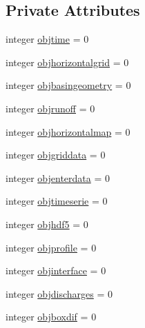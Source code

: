 \subsection*{Private Attributes}
\begin{DoxyCompactItemize}
\item 
integer \mbox{\hyperlink{structmodulerunoffproperties_1_1t__runoffproperties_a5240f215e0abb8b4ef0f3f9be17ce68b}{objtime}} = 0
\item 
integer \mbox{\hyperlink{structmodulerunoffproperties_1_1t__runoffproperties_a23798a5351dce008f85a9fdc5c9fb684}{objhorizontalgrid}} = 0
\item 
integer \mbox{\hyperlink{structmodulerunoffproperties_1_1t__runoffproperties_ab6e1d9ad5b45b30c5da14dc7cc34fed4}{objbasingeometry}} = 0
\item 
integer \mbox{\hyperlink{structmodulerunoffproperties_1_1t__runoffproperties_a450ccd816c0a3e8136be75bfd4281734}{objrunoff}} = 0
\item 
integer \mbox{\hyperlink{structmodulerunoffproperties_1_1t__runoffproperties_aff9c76bfeff2282404fe278de408d48d}{objhorizontalmap}} = 0
\item 
integer \mbox{\hyperlink{structmodulerunoffproperties_1_1t__runoffproperties_abe041f5bf678e3b71ae0e65f28f46e12}{objgriddata}} = 0
\item 
integer \mbox{\hyperlink{structmodulerunoffproperties_1_1t__runoffproperties_a482a12d5007ee3b3d3380cf39ce091d6}{objenterdata}} = 0
\item 
integer \mbox{\hyperlink{structmodulerunoffproperties_1_1t__runoffproperties_a775e25f7ab0700191a2c07dfe5b9b155}{objtimeserie}} = 0
\item 
integer \mbox{\hyperlink{structmodulerunoffproperties_1_1t__runoffproperties_a0bfc750dc6cde51cd602dde65c52ab4b}{objhdf5}} = 0
\item 
integer \mbox{\hyperlink{structmodulerunoffproperties_1_1t__runoffproperties_a08bf14e076f5a7f4e117892edf109049}{objprofile}} = 0
\item 
integer \mbox{\hyperlink{structmodulerunoffproperties_1_1t__runoffproperties_a06b99728140642d4f5359c14296a7d59}{objinterface}} = 0
\item 
integer \mbox{\hyperlink{structmodulerunoffproperties_1_1t__runoffproperties_a2628a55750ffe9263856969d45699980}{objdischarges}} = 0
\item 
integer \mbox{\hyperlink{structmodulerunoffproperties_1_1t__runoffproperties_a8db6461de3af97c16225ab873771e6bb}{objboxdif}} = 0
\item 

\end{DoxyCompactItemize}
